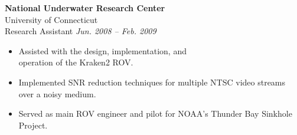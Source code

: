 \documentclass[11pt, twoside, a4paper]{article}
\begin{document}
{\begin{multicols}{2}
                \textbf{National Underwater Research Center}\\ \hfill 
            	University of Connecticut\\ 
            	Research Assistant \hfill \textsl{Jun. 2008 -- Feb. 2009} \\
                \vspace{ -10px}
                \begin{itemize}[noitemsep,nolistsep]
                	\item Assisted with the design, implementation, and \\operation of the Kraken2 ROV.
                	\item Implemented SNR reduction techniques for multiple NTSC video streams over a noisy medium.
                	\item Served as main ROV engineer and pilot for NOAA's Thunder Bay Sinkhole Project. 
                \end{itemize}
                \vspace{5px}

\end{multicols}}
\end{document}
